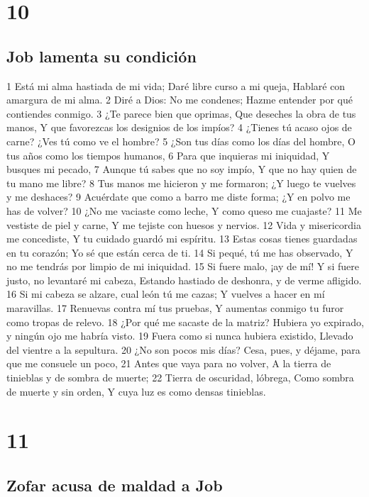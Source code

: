 \chapter{10}

\section*{Job lamenta su condición  }


1 Está mi alma hastiada de mi vida;  
Daré libre curso a mi queja,  
Hablaré con amargura de mi alma.  
2 Diré a Dios: No me condenes;  
Hazme entender por qué contiendes conmigo.  
3 ¿Te parece bien que oprimas,  
Que deseches la obra de tus manos,  
Y que favorezcas los designios de los impíos?  
4 ¿Tienes tú acaso ojos de carne?  
¿Ves tú como ve el hombre?  
5 ¿Son tus días como los días del hombre,  
O tus años como los tiempos humanos,  
6 Para que inquieras mi iniquidad,  
Y busques mi pecado,  
7 Aunque tú sabes que no soy impío,  
Y que no hay quien de tu mano me libre?  
8 Tus manos me hicieron y me formaron;  
¿Y luego te vuelves y me deshaces?  
9 Acuérdate que como a barro me diste forma;  
¿Y en polvo me has de volver?  
10 ¿No me vaciaste como leche,  
Y como queso me cuajaste?  
11 Me vestiste de piel y carne,  
Y me tejiste con huesos y nervios. 
12 Vida y misericordia me concediste,  
Y tu cuidado guardó mi espíritu.  
13 Estas cosas tienes guardadas en tu corazón;  
Yo sé que están cerca de ti.  
14 Si pequé, tú me has observado,  
Y no me tendrás por limpio de mi iniquidad. 
15 Si fuere malo, ¡ay de mí!  
Y si fuere justo, no levantaré mi cabeza,  
Estando hastiado de deshonra, y de verme afligido.  
16 Si mi cabeza se alzare, cual león tú me cazas;  
Y vuelves a hacer en mí maravillas.  
17 Renuevas contra mí tus pruebas,  
Y aumentas conmigo tu furor como tropas de relevo.  
18 ¿Por qué me sacaste de la matriz?  
Hubiera yo expirado, y ningún ojo me habría visto.  
19 Fuera como si nunca hubiera existido,  
Llevado del vientre a la sepultura.  
20 ¿No son pocos mis días?  
Cesa, pues, y déjame, para que me consuele un poco,  
21 Antes que vaya para no volver,  
A la tierra de tinieblas y de sombra de muerte;  
22 Tierra de oscuridad, lóbrega,  
Como sombra de muerte y sin orden,  
Y cuya luz es como densas tinieblas.  

\chapter{11}

\section*{Zofar acusa de maldad a Job}


